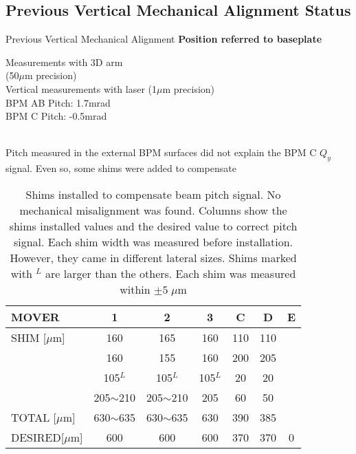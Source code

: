 \subsection{Previous Vertical Mechanical Alignment Status}
Previous Vertical Mechanical Alignment
\centering\vspace*{0cm}
\textbf{Position referred to {\color{blue} baseplate}}\\
\raggedright
\begin{minipage}{0.5\textwidth}
\end{minipage}\hfill\hspace*{-2cm}\vspace*{2cm}
\begin{minipage}{0.5\textwidth}
Measurements with 3D arm\\
\hspace*{0.5cm}(50$\mu$m precision)\\
Vertical measurements with laser
\hspace*{0.5cm}(1$\mu$m precision)\\
BPM AB Pitch: 1.7mrad\\
BPM C Pitch: -0.5mrad
\end{minipage}\\\vspace*{-1.2cm}
Pitch measured in the external BPM surfaces did not explain the BPM C $Q_y$ signal. Even so, some shims were added to compensate
\begin{table}[htb]
\begin{center}
\begin{tabular}{|l|c|c|c|c|c|c|}\hline
 MOVER & 1&2&3&C&D&E\\\hline\hline
 SHIM [$\mu$m]& 160&165&160&110&110&\\
 &160&155&160&200&205&\\
 &105$^L$&105$^L$&105$^L$&20&20&\\
 &205$\sim$210&205$\sim$210&205&60&50&\\\hline\hline
 TOTAL [$\mu$m]&630$\sim$635&630$\sim$635&630&390&385&\\\hline
 DESIRED[$\mu$m]& 600&600&600&370&370&0\\\hline
\end{tabular}
\caption{Shims installed to compensate beam pitch signal. No mechanical misalignment was found. Columns show the shims installed values and the desired value to correct pitch signal. Each shim width was measured before installation. However, they came in different lateral sizes. Shims marked with $^L$ are larger than the others. Each shim was measured within $\pm5\;\mu$m}
\end{center}
\end{table}




